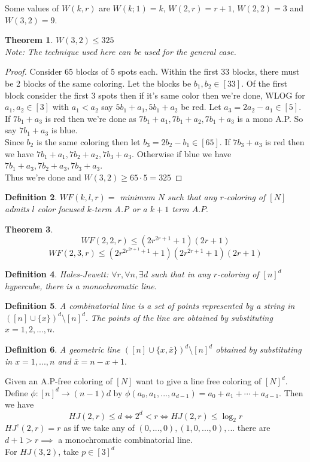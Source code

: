 \documentclass[a4paper]{article}
\newtheorem{thm}{Theorem}[section]
\newtheorem{defn}[thm]{Definition}
\begin{document}
 \noindent Some values of $W(k,r)$ are $W(k;1)=k$, $W(2,r)=r+1$, $W(2,2)=3$ and $W(3,2)=9.$
 \begin{thm}
     $W(3,2)\leq 325$\\
     Note: The technique used here can be used for the general case.
 \end{thm}
 \begin{proof}
     Consider $65$ blocks of $5$ spots each. Within the first 33 blocks, there must be 2 blocks of the same coloring. Let the blocks be $b_1,b_2\in [33]$. Of the first block consider the first 3 spots then if it's same color then we're done, WLOG for $a_1,a_2\in [3]$ with $a_1<a_2$ say $5b_1+a_1,5b_1+a_2$ be red. Let $a_3=2a_2-a_1\in [5].$ If $7b_1+a_3$ is red then we're done as $7b_1+a_1,7b_1+a_2,7b_1+a_3$ is a mono A.P. So say $7b_1+a_3$ is blue.\\
     Since $b_2$ is the same coloring then let $b_3=2b_2-b_1\in [65]$. If $7b_3+a_3$ is red then we have $7b_1+a_1,7b_2+a_2,7b_3+a_3$. Otherwise if blue we have $7b_1+a_3,7b_2+a_3,7b_3+a_3$.\\
     Thus we're done and $W(3,2)\geq 65\cdot 5=325$
 \end{proof}
\begin{defn}
    $WF(k,l,r)=$ minimum $N$ such that any $r$-coloring of $[N]$ admits $l$ color focused $k$-term A.P or a $k+1$ term $A.P.$
\end{defn}
\begin{thm}
    $$WF(2,2,r)\leq (2r^{2r+1}+1)(2r+1)$$
    $$WF(2,3,r)\leq (2r^{2r^{2r+1}+1}+1)(2r^{2r+1}+1)(2r+1)$$
\end{thm}
\begin{defn}
    Hales-Jewett: $\forall r, \forall n,\exists d$ such that in any $r$-coloring of $[n]^d$ hypercube, there is a monochromatic line.
\end{defn}
\begin{defn}
    A combinatorial line is a set of points represented by a string in $([n]\cup \{x\})^d\setminus [n]^d.$ The points of the line are obtained by substituting $x=1,2,...,n.$
\end{defn}
\begin{defn}
    A geometric line $([n]\cup \{x,\overline{x}\})^d\setminus [n]^d$ obtained by substituting in $x=1,...,n$ and $\overline{x}=n-x+1.$
\end{defn}
\noindent Given an A.P-free coloring of $[N]$ want to give a line free coloring of $[N]^d.$ Define $\phi:[n]^d\to (n-1)d$ by $\phi(a_0,a_1,...,a_{d-1})= a_0+a_1+\cdots +a_{d-1}.$ Then we have $$HJ(2,r)\leq d\iff 2^d<r\iff HJ(2,r)\leq \log_2r$$
$HJ^c(2,r)=r$ as if we take any of $(0,...,0),(1,0,...,0),...$ there are $d+1>r\implies$ a monochromatic combinatorial line. \\
For $HJ(3,2)$, take $p\in [3]^d$\\
\end{document}

